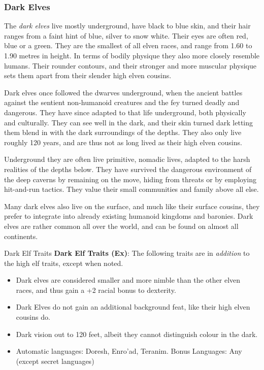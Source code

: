 \subsubsection{Dark Elves}
\label{sec:Dark Elves}

The \emph{dark elves} live mostly underground, have black to blue skin, and
their hair ranges from a faint hint of blue, silver to snow white. Their eyes
are often red, blue or a green. They are the smallest of all elven races, and
range from 1.60 to 1.90 metres in height. In terms of bodily physique they
also more closely resemble humans. Their rounder contours, and their stronger
and more muscular physique sets them apart from their slender high elven
cousins.

Dark elves once followed the dwarves underground, when the ancient battles
against the sentient non-humanoid creatures and the fey turned deadly and
dangerous. They have since adapted to that life underground, both physically
and culturally. They can see well in the dark, and their skin turned dark
letting them blend in with the dark surroundings of the depths. They also only
live roughly 120 years, and are thus not as long lived as their high elven
cousins.

Underground they are often live primitive, nomadic lives, adapted to the harsh
realities of the depths below. They have survived the dangerous environment of
the deep caverns by remaining on the move, hiding from threats or by employing
hit-and-run tactics. They value their small communities and family above all
else.

Many dark elves also live on the surface, and much like their surface cousins,
they prefer to integrate into already existing humanoid kingdoms and baronies.
Dark elves are rather common all over the world, and can be found on almost all
continents.

\begin{35e}{Dark Elf Traits}
  \textbf{Dark Elf Traits (Ex)}: The following traits are in \emph{addition}
  to the high elf traits, except when noted.
  \begin{itemize}[noitemsep]
    \item Dark elves are considered smaller and more nimble than the other
      elven races, and thus gain a +2 racial bonus to dexterity.
    \item Dark Elves do not gain an additional background feat, like their
      high elven cousins do.
    \item Dark vision out to 120 feet, albeit they cannot distinguish colour
      in the dark.
    \item Automatic languages: Doresh, Enro'ad, Teranim. Bonus Languages: Any
      (except secret languages)
  \end{itemize}
\end{35e}

